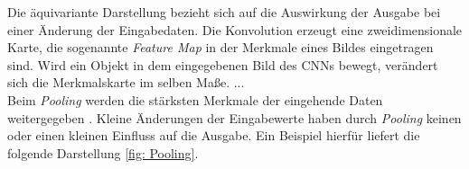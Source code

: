 		Die äquivariante Darstellung bezieht sich auf die Auswirkung der Ausgabe bei einer Änderung der Eingabedaten. Die Konvolution erzeugt eine zweidimensionale Karte, die sogenannte \textit{Feature Map} in der Merkmale eines Bildes eingetragen sind. Wird ein Objekt in dem eingegebenen Bild des CNNs bewegt, verändert sich die Merkmalskarte im selben Maße. ...\\
		
		
		Beim \textit{Pooling} werden die stärksten Merkmale der eingehende Daten weitergegeben \cite{deeplearning}. Kleine Änderungen der Eingabewerte haben durch \textit{Pooling} keinen oder einen kleinen Einfluss auf die Ausgabe. Ein Beispiel hierfür liefert die folgende Darstellung \ref{fig: Pooling}.\\
		
